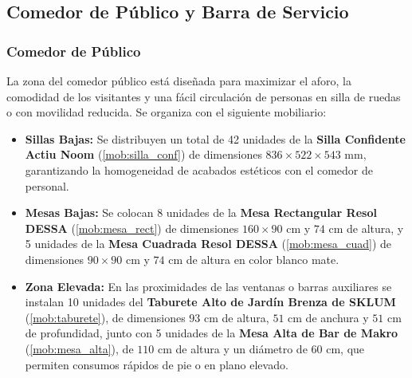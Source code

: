 \subsection{Comedor de Público y Barra de Servicio}

\subsubsection{Comedor de Público}
La zona del comedor público está diseñada para maximizar el aforo, la comodidad de los visitantes y una fácil circulación de personas en silla de ruedas o con movilidad reducida. Se organiza con el siguiente mobiliario:
\begin{itemize}
    \item \textbf{Sillas Bajas:} Se distribuyen un total de 42 unidades de la \textbf{Silla Confidente Actiu Noom} (\ref{mob:silla_conf}) de dimensiones $836\times522\times543\text{ mm}$, garantizando la homogeneidad de acabados estéticos con el comedor de personal.
    \item \textbf{Mesas Bajas:} Se colocan 8 unidades de la \textbf{Mesa Rectangular Resol DESSA} (\ref{mob:mesa_rect}) de dimensiones $160\times90\text{ cm}$ y $74\text{ cm}$ de altura, y 5 unidades de la \textbf{Mesa Cuadrada Resol DESSA} (\ref{mob:mesa_cuad}) de dimensiones $90\times90\text{ cm}$ y $74\text{ cm}$ de altura en color blanco mate.
    \item \textbf{Zona Elevada:} En las proximidades de las ventanas o barras auxiliares se instalan 10 unidades del \textbf{Taburete Alto de Jardín Brenza de SKLUM} (\ref{mob:taburete}), de dimensiones $93\text{ cm}$ de altura, $51\text{ cm}$ de anchura y $51\text{ cm}$ de profundidad, junto con 5 unidades de la \textbf{Mesa Alta de Bar de Makro} (\ref{mob:mesa_alta}), de $110\text{ cm}$ de altura y un diámetro de $60\text{ cm}$, que permiten consumos rápidos de pie o en plano elevado.
\end{itemize}

